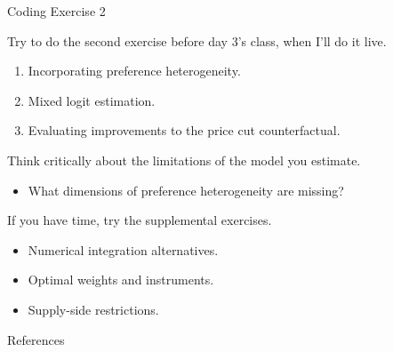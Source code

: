 \documentclass[aspectratio=169,t,11pt,table]{beamer}
\begin{document}
\begin{frame}{Coding Exercise 2}
    \begin{wideitemize}
        \item Try to do the second exercise before day 3's class, when I'll do it live.
        \begin{enumerate}
            \item Incorporating preference heterogeneity.
            \item Mixed logit estimation.
            \item Evaluating improvements to the price cut counterfactual.
        \end{enumerate}
        \pause
        \item Think critically about the limitations of the model you estimate.
        \begin{itemize}
            \item What dimensions of preference heterogeneity are missing?
        \end{itemize}
        \pause
        \item If you have time, try the supplemental exercises.
        \begin{itemize}
            \item Numerical integration alternatives.
            \item Optimal weights and instruments.
            \item Supply-side restrictions.
        \end{itemize}
    \end{wideitemize}
\end{frame}

\backupbegin

\begin{frame}{References}
    
\end{frame}

\backupend
\end{document}
